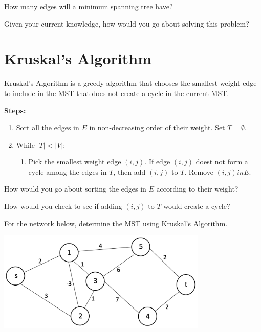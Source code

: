 \documentclass[12pt]{article}
\theoremstyle{definition}
\begin{document}
How many edges will a minimum spanning tree have?


\vfill

Given your current knowledge, how would you go about solving this problem?
\vfill

\newpage
\section{Kruskal's Algorithm}

Kruskal's Algorithm is a greedy algorithm that chooses the smallest weight edge to include in the MST that does not create a cycle in the current MST.

\textbf{Steps:}

\begin{enumerate}
	\item Sort all the edges in $E$ in non-decreasing order of their weight. Set $T = \emptyset$.
	\item While $|T| < |V|$:
	\begin{enumerate}
		\item Pick the smallest weight edge $(i,j)$. If edge $(i,j)$ doest not form a cycle among the edges in $T$, then add $(i,j)$ to $T$. Remove $(i,j) in E$. 
	\end{enumerate}
\end{enumerate}

\vfill

How would you go about sorting the edges in $E$ according to their weight? 

\vfill

How would you check to see if adding $(i,j)$ to $T$ would create a cycle?
\vfill

\newpage

For the network below, determine the MST using Kruskal's Algorithm.

\begin{center}
\includegraphics[width=10cm]{minspanningtree}
\end{center}
\end{document}

